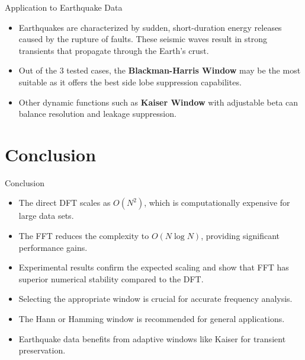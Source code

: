 \documentclass[10pt]{beamer}
\begin{document}
\begin{frame}{Application to Earthquake Data}
  \begin{itemize}
    \item Earthquakes are characterized by sudden, short-duration energy releases caused by the rupture of faults.
These seismic waves result in strong transients that propagate through the Earth’s crust.
    \item Out of the 3 tested cases, the \textbf{Blackman-Harris Window} may be the most suitable as it offers the best side lobe suppression capabilites. 
    \item Other dynamic functions such as  \textbf{Kaiser Window} with adjustable beta can balance resolution and leakage suppression.
  \end{itemize}
\end{frame}

\section{Conclusion}

\begin{frame}{Conclusion}
  \begin{itemize}
    \item The direct DFT scales as \(O(N^2)\), which is computationally expensive for large data sets.
    \item The FFT reduces the complexity to \(O(N \log N)\), providing significant performance gains.
    \item Experimental results confirm the expected scaling and show that FFT has superior numerical stability compared to the DFT.
  \end{itemize}
  \begin{itemize}
    \item Selecting the appropriate window is crucial for accurate frequency analysis.
    \item The Hann or Hamming window is recommended for general applications.
    \item Earthquake data benefits from adaptive windows like Kaiser for transient preservation.
  \end{itemize}
\end{frame}
\end{document}
